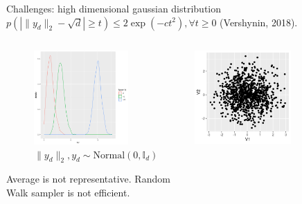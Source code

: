 \documentclass[bigger]{beamer}
\begin{document}
\begin{frame}[label={sec:org6c1bdec}]{Challenges: high dimensional gaussian distribution}
\small \(p(|\|y_d\|_2-\sqrt{d}| \ge t) \le 2\exp{(-ct^2)}, \forall t\ge 0\) (Vershynin, 2018).
\begin{columns}
\begin{column}{0.5\columnwidth}
\begin{figure}[htbp]
\centering
\includegraphics[width=0.8\textwidth]{./figure/high_dim_gaussian.png}
\caption{\(\|y_d\|_2, y_d \sim \text{Normal}(0, \mathbb{I}_d)\)}
\end{figure}

\small Average is not representative. Random Walk sampler is not efficient.
\end{column}

\begin{column}{0.5\columnwidth}
\begin{center}
\includegraphics[width=0.6\textwidth]{./figure/d2_normal_point.png}
\end{center}


\end{column}
\end{columns}
\end{frame}
\end{document}
